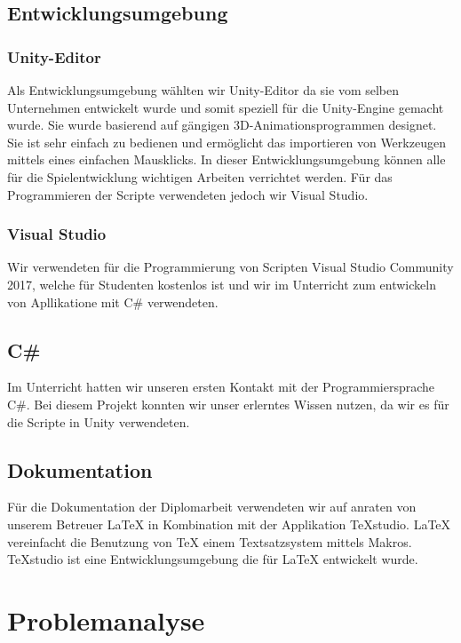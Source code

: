 \section{Entwicklungsumgebung}
\subsection{Unity-Editor}
Als Entwicklungsumgebung wählten wir Unity-Editor da sie vom selben Unternehmen entwickelt wurde und somit speziell für die Unity-Engine gemacht wurde. Sie wurde basierend auf gängigen 3D-Animationsprogrammen designet. Sie ist sehr einfach zu bedienen und ermöglicht das importieren von Werkzeugen mittels eines einfachen Mausklicks. In dieser Entwicklungsumgebung können alle für die Spielentwicklung wichtigen Arbeiten verrichtet werden. Für das Programmieren der Scripte verwendeten jedoch wir Visual Studio. \cite{Unity-Engine}

\subsection{Visual Studio}
Wir verwendeten für die Programmierung von Scripten Visual Studio Community 2017, welche für Studenten kostenlos ist und wir im Unterricht zum entwickeln von Apllikatione mit C\#  verwendeten. 

\section{C\#}
Im Unterricht hatten wir unseren ersten Kontakt mit der Programmiersprache C\#. Bei diesem Projekt konnten wir unser erlerntes Wissen nutzen, da wir es für die Scripte in Unity verwendeten. 

\section{Dokumentation}
Für die Dokumentation der Diplomarbeit verwendeten wir auf anraten von unserem Betreuer LaTeX in Kombination mit der Applikation TeXstudio.
LaTeX vereinfacht die Benutzung von TeX einem Textsatzsystem mittels Makros. TeXstudio ist eine Entwicklungsumgebung die für LaTeX entwickelt wurde. \cite{Latex}
\chapter{Problemanalyse}
